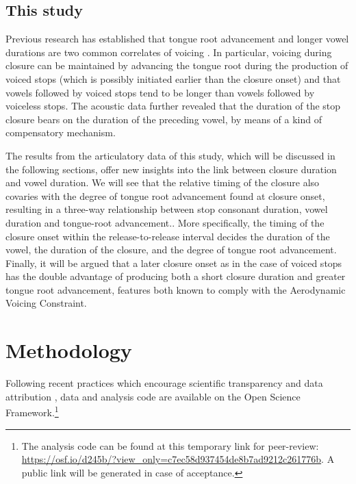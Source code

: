 \documentclass[preprint]{JASAnew}
\begin{document}
\hypertarget{this-study}{%
\subsection{This study}\label{this-study}}

Previous research has established that tongue root advancement and
longer vowel durations are two common correlates of voicing
\citep{kent1969, perkell1969, westbury1983, house1953, peterson1960, chen1970}.
In particular, voicing during closure can be maintained by advancing the
tongue root during the production of voiced stops (which is possibly
initiated earlier than the closure onset) and that vowels followed by
voiced stops tend to be longer than vowels followed by voiceless stops.
The acoustic data further revealed that the duration of the stop closure
bears on the duration of the preceding vowel, by means of a kind of
compensatory mechanism.

The results from the articulatory data of this study, which will be
discussed in the following sections, offer new insights into the link
between closure duration and vowel duration. We will see that the
relative timing of the closure also covaries with the degree of tongue
root advancement found at closure onset, resulting in a three-way
relationship between stop consonant duration, vowel duration and
tongue-root advancement.. More specifically, the timing of the closure
onset within the release-to-release interval decides the duration of the
vowel, the duration of the closure, and the degree of tongue root
advancement. Finally, it will be argued that a later closure onset as in
the case of voiced stops has the double advantage of producing both a
short closure duration and greater tongue root advancement, features
both known to comply with the Aerodynamic Voicing Constraint.

\hypertarget{methodology}{%
\section{Methodology}\label{methodology}}

Following recent practices which encourage scientific transparency and
data attribution \citep{cruwell2018, berez-kroeker2018, roettger2019},
data \citep{coretta2018m} and analysis code are available on the Open
Science
Framework.\footnote{The analysis code can be found at this temporary link for peer-review: \url{https://osf.io/d245b/?view_only=c7ec58d937454de8b7ad9212c261776b}. A public link will be generated in case of acceptance.}
\end{document}
